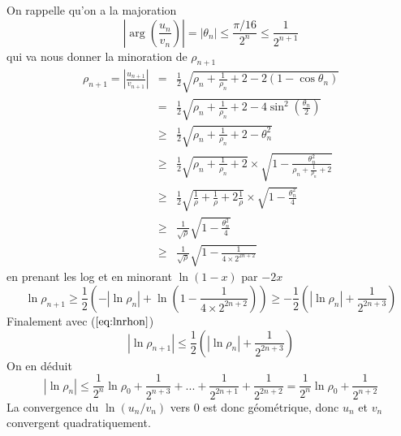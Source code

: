\documentclass[a4paper,11pt]{article}
\begin{document}
\begin{giacjshere}
\begin{equation}
\end{equation}
On rappelle qu'on a la majoration 
\[ |\arg(\frac{u_n}{v_n})| = |\theta_n| \leq \frac{\pi/16}{2^n} \leq \frac{1}{2^{n+1}} \]
qui va nous donner la minoration de $\rho_{n+1}$ 
\begin{eqnarray*}
\rho_{n+1}=|\frac{u_{n+1}}{v_{n+1}}| & = & \frac{1}{2}
\sqrt{ \rho_n+ \frac{1}{\rho_n} +2 - 2 (1-\cos \theta_n) } \\
& = &  \frac{1}{2} \sqrt{ \rho_n+ \frac{1}{\rho_n} +2 - 4 \sin^2 (\frac{\theta_n}{2}) } \\
& \geq &  \frac{1}{2} \sqrt{ \rho_n+ \frac{1}{\rho_n} +2 - \theta_n^2} \\
& \geq &  \frac{1}{2} \sqrt{ \rho_n+ \frac{1}{\rho_n} +2} \times 
\sqrt{1 - \frac{\theta_n^2}{\rho_n+ \frac{1}{\rho_n} +2}} \\
& \geq &  \frac{1}{2} \sqrt{ \frac{1}{\rho} + \frac{1}{\rho} +2\frac{1}{\rho}} \times 
\sqrt{1 - \frac{\theta_n^2}{4}} \\
& \geq & \frac{1}{\sqrt{\rho}} \sqrt{1 - \frac{\theta_n^2}{4}} \\
& \geq & \frac{1}{\sqrt{\rho}} \sqrt{1 - \frac{1} {4 \times 2^{2n+2}}}
\end{eqnarray*}
en prenant les log et en minorant $\ln(1-x)$ par $-2x$
\[ \ln \rho_{n+1} \geq \frac{1}{2} (-|\ln \rho_n|+\ln(1 -\frac{1} {4 \times 2^{2n+2}} ))
\geq -\frac{1}{2} (|\ln \rho_n|+\frac{1} {2^{2n+3}} )  \]
Finalement avec (\(\ref{eq:lnrhon}\))
\[ |\ln \rho_{n+1}|
\leq \frac{1}{2} (|\ln \rho_n|+\frac{1}{2^{2n+3}} ) \]
On en déduit
\[ |\ln \rho_n| \leq \frac{1}{2^n} \ln \rho_0 + \frac{1}{2^{n+3}} + ... +
\frac{1}{2^{2n+1}} +  \frac{1}{2^{2n+2}}
= \frac{1}{2^n} \ln \rho_0 + \frac{1}{2^{n+2}} \]
La convergence du $\ln(u_n/v_n)$ vers 0 est donc géométrique, donc $u_n$ et $v_n$ convergent
quadratiquement.


\end{giacjshere}
\end{document}
